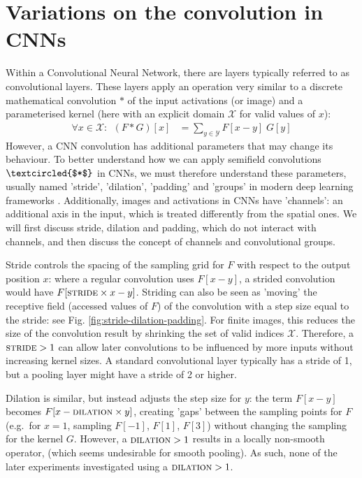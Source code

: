 \documentclass[a4paper, 12pt]{report}
\begin{document}
\section{Variations on the convolution in CNNs}
Within a Convolutional Neural Network, there are layers typically referred to as convolutional layers. These layers apply an operation very similar to a discrete mathematical convolution $*$ of the input activations (or image) and a parameterised kernel (here with an explicit domain $\mathcal{X}$ for valid values of $x$):
\begin{align}
\forall x\in\mathcal{X}:~~(F*G)[x] &= \sum_{y\in\mathcal{Y}} F[x-y]\; G[y]
\end{align}
However, a CNN convolution has additional parameters that may change its behaviour. To better understand how we can apply semifield convolutions $\textcircled{$*$}$ in CNNs, we must therefore understand these parameters, usually named 'stride', 'dilation', 'padding'  and 'groups' in modern deep learning frameworks \cite{noauthor_conv2d_nodate, noauthor_xla_nodate}. Additionally, images and activations in CNNs have 'channels': an additional axis in the input, which is treated differently from the spatial ones. We will first discuss stride, dilation and padding, which do not interact with channels, and then discuss the concept of channels and convolutional groups.

Stride controls the spacing of the sampling grid for $F$ with respect to the output position $x$: where a regular convolution uses $F[x-y]$, a strided convolution would have $F[\textsc{stride}\times x - y]$. Striding can also be seen as 'moving' the receptive field (accessed values of $F$) of the convolution with a step size equal to the stride: see Fig. \ref{fig:stride-dilation-padding}. For finite images, this reduces the size of the convolution result by shrinking the set of valid indices $\mathcal{X}$. Therefore, a $\textsc{stride}>1$ can allow later convolutions to be influenced by more inputs without increasing kernel sizes. A standard convolutional layer typically has a stride of 1, but a pooling layer might have a stride of 2 or higher.

Dilation is similar, but instead adjusts the step size for $y$: the term $F[x-y]$ becomes $F[x-\textsc{dilation}\times y]$, creating 'gaps' between the sampling points for $F$ (e.g.\ for $x=1$, sampling $F[-1]$, $F[1]$, $F[3]$) without changing the sampling for the kernel $G$. However, a $\textsc{dilation}>1$ results in a locally non-smooth operator, (which seems undesirable for smooth pooling). As such, none of the later experiments investigated using a $\textsc{dilation}>1$.
\end{document}
